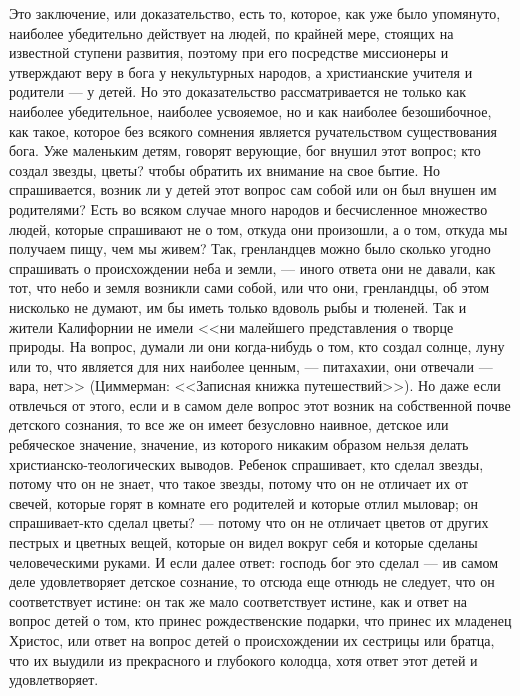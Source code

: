 \documentclass[12pt]{article}
\begin{document}
Это заключение, или доказательство, есть то, которое, как уже было упомянуто, наиболее убедительно действует на людей, по крайней мере, стоящих на известной ступени развития, поэтому при его посредстве миссионеры и утверждают веру в бога у некультурных народов, а христианские учителя и родители --- у детей. Но это доказательство рассматривается не только как наиболее убедительное, наиболее усвояемое, но и как наиболее безошибочное, как такое, которое без всякого сомнения является ручательством существования бога. Уже маленьким детям, говорят верующие, бог внушил этот вопрос; кто создал звезды, цветы? чтобы обратить их внимание на свое бытие. Но спрашивается, возник ли у детей этот вопрос сам собой или он был внушен им родителями? Есть во всяком случае много народов и бесчисленное множество людей, которые спрашивают не о том, откуда они произошли, а о том, откуда мы получаем пищу, чем мы живем? Так, гренландцев можно было сколько угодно спрашивать о происхождении неба и земли, --- иного ответа они не давали, как тот, что небо и земля возникли сами собой, или что они, гренландцы, об этом нисколько не думают, им бы иметь только вдоволь рыбы и тюленей. Так и жители Калифорнии не имели <<ни малейшего представления о творце природы. На вопрос, думали ли они когда-нибудь о том, кто создал солнце, луну или то, что является для них наиболее ценным, --- питахахии, они отвечали --- вара, нет>> (Циммерман: <<Записная книжка путешествий>>). Но даже если отвлечься от этого, если и в самом деле вопрос этот возник на собственной почве детского сознания, то все же он имеет безусловно наивное, детское или ребяческое значение, значение, из которого никаким образом нельзя делать христианско-теологических выводов. Ребенок спрашивает, кто сделал звезды, потому что он не знает, что такое звезды, потому что он не отличает их от свечей, которые горят в комнате его родителей и которые отлил мыловар; он спрашивает-кто сделал цветы? --- потому что он не отличает цветов от других пестрых и цветных вещей, которые он видел вокруг себя и которые сделаны человеческими руками. И если далее ответ: господь бог это сделал --- ив самом деле удовлетворяет детское сознание, то отсюда еще отнюдь не следует, что он соответствует истине: он так же мало соответствует истине, как и ответ на вопрос детей о том, кто принес рождественские подарки, что принес их младенец Христос, или ответ на вопрос детей о происхождении их сестрицы или братца, что их выудили из прекрасного и глубокого колодца, хотя ответ этот детей и удовлетворяет. 
\end{document}
